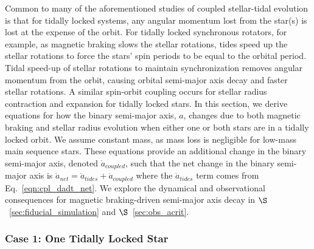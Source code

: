 Common to many of the aforementioned studies of coupled stellar-tidal evolution is that for tidally locked systems, any angular momentum lost from the star(s) is lost at the expense of the orbit.  For tidally locked synchronous rotators, for example, as magnetic braking slows the stellar rotations, tides speed up the stellar rotations to force the stars' spin periods to be equal to the orbital period.  Tidal speed-up of stellar rotations to maintain synchronization removes angular momentum from the orbit, causing orbital semi-major axis decay and faster stellar rotations.  A similar spin-orbit coupling occurs for stellar radius contraction and expansion for tidally locked stars.  In this section, we derive equations for how the binary semi-major axis, $a$, changes due to both magnetic braking and stellar radius evolution when either one or both stars are in a tidally locked orbit.  We assume constant mass, as mass loss is negligible for low-mass main sequence stars.  These equations provide an additional change in the binary semi-major axis, denoted $\dot{a}_{coupled}$, such that the net change in the binary semi-major axis is $\dot{a}_{net} = \dot{a}_{tides} + \dot{a}_{coupled}$ where the $\dot{a}_{tides}$ term comes from \eqtide Eq.~{\ref{eqn:cpl_dadt_net}}. We explore the dynamical and observational consequences for magnetic braking-driven semi-major axis decay in $\S$~\ref{sec:fiducial_simulation} and $\S$~\ref{sec:obs_acrit}.

\subsubsection{Case 1: One Tidally Locked Star}

